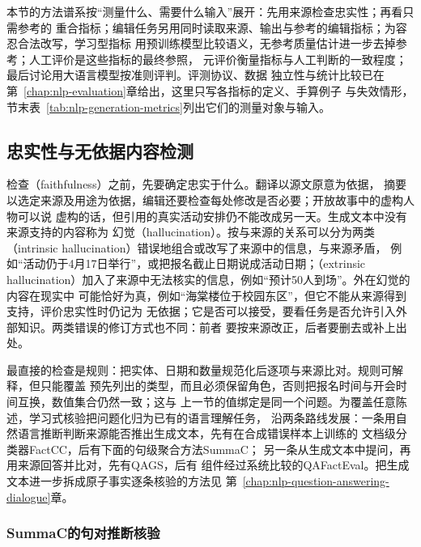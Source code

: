 本节的方法谱系按“测量什么、需要什么输入”展开：先用来源检查忠实性；再看只需参考的
重合指标；编辑任务另用同时读取来源、输出与参考的编辑指标；为容忍合法改写，学习型指标
用预训练模型比较语义，无参考质量估计进一步去掉参考；人工评价是这些指标的最终参照，
元评价衡量指标与人工判断的一致程度；最后讨论用大语言模型按准则评判。评测协议、数据
独立性与统计比较已在第~\ref{chap:nlp-evaluation}章给出，这里只写各指标的定义、手算例子
与失效情形，节末表~\ref{tab:nlp-generation-metrics}列出它们的测量对象与输入。

\subsection{忠实性与无依据内容检测}
\label{sec:nlp-generation-faithfulness}

检查（faithfulness）之前，先要确定忠实于什么。翻译以源文原意为依据，
摘要以选定来源及用途为依据，编辑还要检查每处修改是否必要；开放故事中的虚构人物可以说
虚构的话，但引用的真实活动安排仍不能改成另一天。生成文本中没有来源支持的内容称为
幻觉（hallucination）。按与来源的关系可以分为两类
（intrinsic hallucination）错误地组合或改写了来源中的信息，与来源矛盾，
例如“活动仍于4月17日举行”，或把报名截止日期说成活动日期；（extrinsic
hallucination）加入了来源中无法核实的信息，例如“预计50人到场”。外在幻觉的内容在现实中
可能恰好为真，例如“海棠楼位于校园东区”，但它不能从来源得到支持，评价忠实性时仍记为
无依据；它是否可以接受，要看任务是否允许引入外部知识。两类错误的修订方式也不同：前者
要按来源改正，后者要删去或补上出处。

最直接的检查是规则：把实体、日期和数量规范化后逐项与来源比对。规则可解释，但只能覆盖
预先列出的类型，而且必须保留角色，否则把报名时间与开会时间互换，数值集合仍然一致；这与
上一节的值绑定是同一个问题。为覆盖任意陈述，学习式核验把问题化归为已有的语言理解任务，
沿两条路线发展：一条用自然语言推断判断来源能否推出生成文本，先有在合成错误样本上训练的
文档级分类器FactCC，后有下面的句级聚合方法SummaC；
另一条从生成文本中提问，再用来源回答并比对，先有QAGS，后有
组件经过系统比较的QAFactEval。把生成文本进一步拆成原子事实逐条核验的方法见
第~\ref{chap:nlp-question-answering-dialogue}章。

\subsubsection{SummaC的句对推断核验}
\label{sec:nlp-generation-summac}

